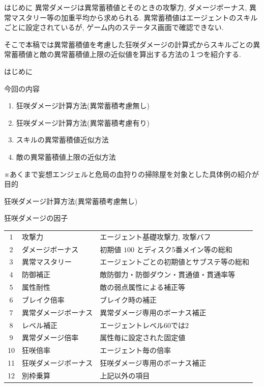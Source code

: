 \documentclass[aspectratio=169]{beamer}
\begin{document}
\begin{frame}{はじめに}
異常ダメージは異常蓄積値とそのときの攻撃力, ダメージボーナス, 異常マスタリー等の加重平均から求められる.
異常蓄積値はエージェントのスキルごとに設定されているが, ゲーム内のステータス画面で確認できない.

そこで本稿では異常蓄積値を考慮した狂咲ダメージの計算式からスキルごとの異常蓄積値と敵の異常蓄積値上限の近似値を算出する方法の１つを紹介する.
\end{frame}

\begin{frame}{はじめに}
\begin{block}{今回の内容}
\begin{enumerate}
	\item 狂咲ダメージ計算方法(異常蓄積考慮無し)
	\item 狂咲ダメージ計算方法(異常蓄積考慮有り)
	\item スキルの異常蓄積値近似方法
	\item 敵の異常蓄積値上限の近似方法
\end{enumerate}
\end{block}
※あくまで妄想エンジェルと危局の血狩りの掃除屋を対象とした具体例の紹介が目的
\end{frame}
\begin{frame}{狂咲ダメージ計算方法(異常蓄積考慮無し)}
\vspace{-0.5em}
\begin{block}{狂咲ダメージの因子}
\begin{tabularx}{\linewidth}{clX}
1 & 攻撃力 & エージェント基礎攻撃力, 攻撃バフ \\
2 & ダメージボーナス & 初期値 $100$ とディスク5番メイン等の総和 \\
3 & 異常マスタリー & エージェントごとの初期値とサブステ等の総和 \\
4 & 防御補正 & 敵防御力・防御ダウン・貫通値・貫通率等 \\
5 & 属性耐性 & 敵の弱点属性による補正等 \\
6 & ブレイク倍率 & ブレイク時の補正 \\
7 & 異常ダメージボーナス & 異常ダメージ専用のボーナス補正 \\
8 & レベル補正 & エージェントレベル60では$2$ \\
9 & 異常ダメージ倍率 & 属性毎に設定された固定値 \\
10 & 狂咲倍率 & エージェント毎の倍率 \\
11 & 狂咲ダメージボーナス & 狂咲ダメージ専用のボーナス補正 \\
12 & 別枠乗算 & 上記以外の項目 \\
\end{tabularx}
\end{block}
\end{frame}
\end{document}
